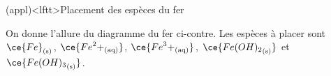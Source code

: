 \documentclass[../../main/main.tex]{subfiles}
\begin{document}
\begin{tcb*}[breakable](appl)<lftt>{Placement des espèces du fer}
	\noindent
	\begin{minipage}[c]{.5\linewidth}
		On donne l'allure du diagramme du fer ci-contre. Les espèces à placer sont
		$\ce{Fe}_{\rm(s)}$, $\ce{{Fe}^2+_{\rm(aq)}}$, $\ce{{Fe}^3+_{\rm(aq)}}$,
		$\ce{{Fe(OH)_2}_{\rm(s)}}$ et $\ce{{Fe(OH)_3}_{\rm(s)}}$.
	\end{minipage}
	\begin{minipage}[c]{.5\linewidth}
		\vspace{0pt}
		\begin{center}
\end{center}
\end{minipage}
\end{tcb*}
\end{document}
